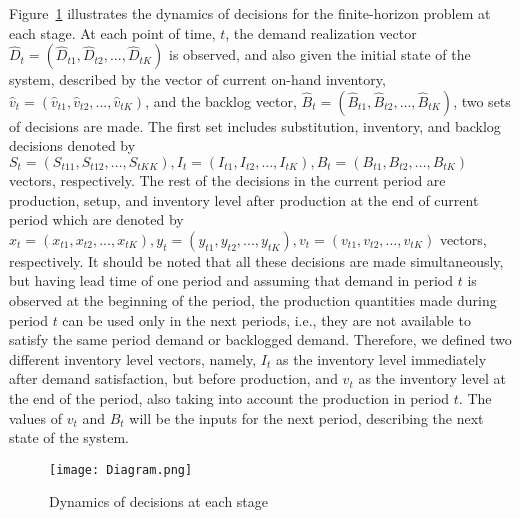 \documentclass[10pt]{article}
\newcommand{\ti}{t} %
\newcommand{\Ka}{K}
\newcommand{\Bi}{B} %
\newcommand{\Vi}{v} %
\newcommand{\Es}{S} %
\newcommand{\InvPos}{inventory level after production }
\begin{document}
Figure~\ref{MultistageDynamics} illustrates the dynamics of decisions for the finite-horizon problem at each stage. 
At each point of time, $\ti$, the demand realization vector $\hat{D}_{\ti} =(\hat{D}_{\ti 1}, \hat{D}_{\ti 2},..., \hat{D}_{\ti \Ka})$ is observed, and also given the initial state of the system, described by the vector of current on-hand inventory, $\hat{\Vi}_{\ti} =(\hat{\Vi}_{\ti 1}, \hat{\Vi}_{\ti 2},..., \hat{\Vi}_{\ti \Ka})$, and the backlog vector, $\hat{\Bi}_{\ti}=(\hat{\Bi}_{\ti 1}, \hat{\Bi}_{\ti 2},..., \hat{\Bi}_{\ti \Ka})$, two sets of decisions are made.
The first set includes substitution, inventory, and backlog decisions denoted by ${\Es}_{\ti}= ({\Es}_{\ti 11}, {\Es}_{\ti 12},\hdots, {\Es}_{\ti \Ka \Ka}), I_{\ti} = ({I}_{\ti 1}, {I}_{\ti 2},..., {I}_{\ti \Ka}), {\Bi}_{\ti} =({\Bi}_{\ti 1}, {\Bi}_{\ti 2},\hdots, {\Bi}_{\ti \Ka})$ vectors, respectively. 
The rest of the decisions in the current period are production, setup, and \InvPos at the end of current period which are denoted by $x_{\ti} = (x_{\ti 1}, x_{\ti 2},..., x_{\ti \Ka}), y_{\ti} = ({y}_{\ti 1}, {y}_{\ti 2},..., {y}_{\ti \Ka}), \Vi_{\ti} = ({\Vi}_{\ti 1}, {\Vi}_{\ti 2},..., {\Vi}_{\ti \Ka})$ vectors, respectively. 
It should be noted that all these decisions are made simultaneously, but having lead time of one period and assuming that demand in period $\ti$ is observed at the beginning of the period, the production quantities made during period $\ti$ can be used only in the next periods, i.e., they are not available to satisfy the same period demand or backlogged demand. Therefore, we defined two different inventory level vectors, namely, $I_{\ti}$ as the inventory level immediately after demand satisfaction, but before production, and $\Vi_{\ti}$ as the inventory level at the end of the period, also taking into account the production in period $\ti$. 
The values of $\Vi_{\ti}$ and $\Bi_{\ti}$ will be the inputs for the next period, describing the next state of the system.
\begin{figure}[!h]
\begin{center}
\texttt{[image: Diagram.png]}
\caption{Dynamics of decisions at each stage} 
\label{MultistageDynamics}
\end{center}
\end{figure}
\end{document}
